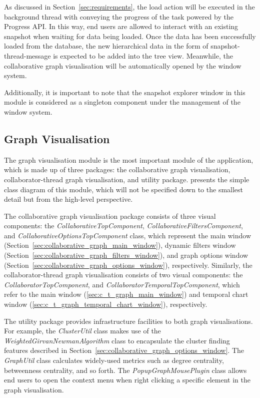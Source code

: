 As discussed in Section~\ref{sec:requirements}, the load action will be executed in the background thread with conveying the progress of the task powered by the Progress API. In this way, end users are allowed to interact with an existing snapshot when waiting for data being loaded. Once the data has been successfully loaded from the database, the new hierarchical data in the form of snapshot-thread-message is expected to be added into the tree view. Meanwhile, the collaborative graph visualisation will be automatically opened by the window system.

Additionally, it is important to note that the snapshot explorer window in this module is considered as a singleton component under the management of the window system.

\subsection{Graph Visualisation}

The graph visualisation module is the most important module of the application, which is made up of three packages: the collaborative graph visualisation, collaborator-thread graph visualisation, and utility package.  presents the simple class diagram of this module, which will not be specified down to the smallest detail but from the high-level perspective.

The collaborative graph visualisation package consists of three visual components: the \emph{CollaborativeTopComponent}, \emph{CollaborativeFiltersComponent}, and \emph{CollaborativeOptionsTopComponent} class, which represent the main window (Section~\ref{sec:collaborative_graph_main_window}), dynamic filters window (Section~\ref{sec:collaborative_graph_filters_window}), and graph options window (Section~\ref{sec:collaborative_graph_options_window}), respectively. Similarly, the collaborator-thread graph visualisation consists of two visual components: the \emph{CollaboratorTopComponent}, and \emph{CollaboratorTemporalTopComponent}, which refer to the main window (\ref{sec:c_t_graph_main_window}) and temporal chart window (\ref{sec:c_t_graph_temporal_chart_window}), respectively.

The utility package provides infrastructure facilities to both graph visualisations. For example, the \emph{ClusterUtil} class makes use of the \emph{WeightedGirvanNewmanAlgorithm} class to encapsulate the cluster finding features described in Section~\ref{sec:collaborative_graph_options_window}. The \emph{GraphUtil} class calculates widely-used metrics such as degree centrality, betweenness centrality, and so forth. The \emph{PopupGraphMousePlugin} class allows end users to open the context menu when right clicking a specific element in the graph visualisation.

